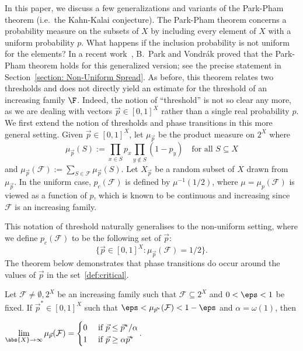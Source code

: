 \documentclass[12pt]{article}
\begin{document}
In this paper, we discuss a few generalizations and variants of the Park-Pham theorem (i.e.\ the Kahn-Kalai conjecture). The Park-Pham theorem concerns a probability measure on the subsets of $X$ by including every element of $X$ with a uniform probability $p$. What happens if the inclusion probability is not uniform for the elements? 
In a recent work~\cite{park2023simple}, B.~Park and Vondr{\'a}k proved that the Park-Pham theorem holds for this generalized version; see the precise statement in Section~\ref{section: Non-Uniform Spread}.
As before, this theorem relates two thresholds and does not directly yield an estimate for the threshold of an increasing family $\F$. Indeed, the notion of ``threshold'' is not so clear any more, as we are dealing with  vectors $\vec{p}\in [0,1]^X$ rather than a single real probability $p$. We first extend the notion of thresholds and phase transitions in this more general setting.
Given $\vec{p}\in [0,1]^X$, let $\mu_{\vec{p}}$ be the product measure on $2^X$ where
\begin{equation}
    \mu_{\vec{p}}(S) := \prod\limits_{x\in S} p_x\prod\limits_{y\notin S} (1-p_y)\quad \text{for all $S\subseteq X$} \label{def:measure}
\end{equation}
 and $\mu_{\vec{p}}(\mathcal{F}) := \sum\limits_{S\in\mathcal{F}} \mu_{\vec{p}}(S)$. Let $X_{\vec{p}}$ be a random subset of $X$ drawn from $\mu_{\vec{p}}$. 
In the uniform case,  $p_c(\mathcal{F})$ is defined by $\mu^{-1}(1/2)$, where $\mu=\mu_{p}({\mathcal F})$ is viewed as a function of $p$, which is known to be continuous and increasing since ${\mathcal F}$ is an increasing family.

This notation of threshold naturally generalises to  the non-uniform setting, where we define $p_c(\mathcal{F})$ to be the following set of $\vec{p}$:
\begin{equation}
\{\vec{p}\in [0,1]^X: \mu_{\vec{p}}(\mathcal{F})=1/2\}. \label{def:critical}
\end{equation}
The theorem below demonstrates that phase transitions do occur around the values of $\vec{p}$ in the set~\eqref{def:critical}.

\begin{theorem}
\label{theorem: Non-Uniform Friedgut}
Let $\mathcal{F}\neq\emptyset, 2^X$ be an increasing family such that $\mathcal{F}\subseteq 2^X$ and $0<\eps<1$ be fixed. If $\vec{p}^*\in [0,1]^X$ such that $\eps<\mu_{\vec{p}^*}(\mathcal{F})<1-\eps $ and $\alpha = \omega(1)$, then
\begin{center}
    $\lim\limits_{\abs{X}\rightarrow\infty} \mu_{\vec{p}}(\mathcal{F}) = \begin{cases} 0 &\text{ if } \vec{p}\leq\vec{p}^*/\alpha\\ 1 &\text{ if } \vec{p}\geq\alpha\vec{p}^*\end{cases}$.
\end{center}
\end{theorem}
\end{document}
